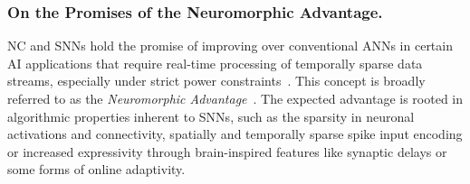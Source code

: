 \subsubsection{On the Promises of the Neuromorphic Advantage.}
\ac{NC} and \acp{SNN} hold the promise of improving over conventional \acp{ANN} in certain AI applications that require real-time processing of temporally sparse data streams, especially under strict power constraints~\cite{bos_sub-mw_2022, shrestha_efficient_2024}. This concept is broadly referred to as the \textit{Neuromorphic Advantage}~\cite{diamond_comparing_2016,aimone_provable_2021,kudithipudi_neuromorphic_2025}. The expected advantage is rooted in algorithmic properties inherent to \acp{SNN}, such as the sparsity in neuronal activations and connectivity, spatially and temporally sparse spike input encoding or increased expressivity through brain-inspired features like synaptic delays or some forms of online adaptivity.

